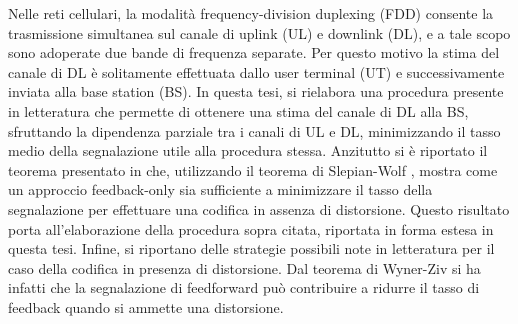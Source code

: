 \newenvironment{abstract}
{\cleardoublepage
\null\vfill
\begin{center}
    \bfseries \abstractname
\end{center}}
{\vfill\null}

\begin{abstract}
    Nelle reti cellulari, la modalità frequency-division duplexing (FDD)
    consente la trasmissione simultanea sul canale di uplink (UL) e downlink
    (DL), e a tale scopo sono adoperate due bande di frequenza separate. Per
    questo motivo la stima del canale di DL è solitamente effettuata dallo user
    terminal (UT) e successivamente inviata alla base station (BS). In questa
    tesi, si rielabora una procedura presente in letteratura che permette di
    ottenere una stima del canale di DL alla BS, sfruttando la dipendenza
    parziale tra i canali di UL e DL, minimizzando il tasso medio della
    segnalazione utile alla procedura stessa. Anzitutto si è riportato il
    teorema presentato in \cite{https://doi.org/10.1002/ett.3628} che,
    utilizzando il teorema di Slepian-Wolf \cite{1055037}, mostra come un
    approccio feedback-only sia sufficiente a minimizzare il tasso della
    segnalazione per effettuare una codifica in assenza di distorsione. Questo
    risultato porta all'elaborazione della procedura sopra citata, riportata in
    forma estesa in questa tesi. Infine, si riportano delle strategie possibili
    note in letteratura per il caso della codifica in presenza di distorsione.
    Dal teorema di Wyner-Ziv \cite{1055508} si ha infatti che la segnalazione
    di feedforward può contribuire a ridurre il tasso di feedback quando si
    ammette una distorsione.
\end{abstract}
